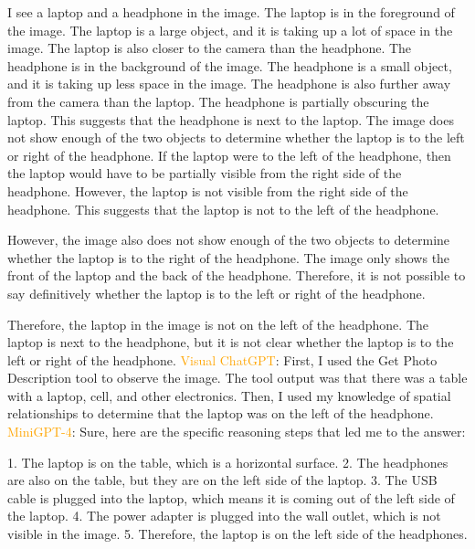 \begin{enumerate}
    I see a laptop and a headphone in the image.
    The laptop is in the foreground of the image. The laptop is a large object, and it is taking up a lot of space in the image. The laptop is also closer to the camera than the headphone.
    The headphone is in the background of the image. The headphone is a small object, and it is taking up less space in the image. The headphone is also further away from the camera than the laptop.
    The headphone is partially obscuring the laptop. This suggests that the headphone is next to the laptop.
    The image does not show enough of the two objects to determine whether the laptop is to the left or right of the headphone.
    If the laptop were to the left of the headphone, then the laptop would have to be partially visible from the right side of the headphone. However, the laptop is not visible from the right side of the headphone. This suggests that the laptop is not to the left of the headphone.
    
    However, the image also does not show enough of the two objects to determine whether the laptop is to the right of the headphone. The image only shows the front of the laptop and the back of the headphone. Therefore, it is not possible to say definitively whether the laptop is to the left or right of the headphone.
    
    Therefore, the laptop in the image is not on the left of the headphone. The laptop is next to the headphone, but it is not clear whether the laptop is to the left or right of the headphone.
    \subitem \textcolor{orange}{Visual ChatGPT}: First, I used the Get Photo Description tool to observe the image. The tool output was that there was a table with a laptop, cell, and other electronics. Then, I used my knowledge of spatial relationships to determine that the laptop was on the left of the headphone.
    \subitem \textcolor{orange}{MiniGPT-4}: Sure, here are the specific reasoning steps that led me to the answer:

    1. The laptop is on the table, which is a horizontal surface.
    2. The headphones are also on the table, but they are on the left side of the laptop.
    3. The USB cable is plugged into the laptop, which means it is coming out of the left side of the laptop.
    4. The power adapter is plugged into the wall outlet, which is not visible in the image.
    5. Therefore, the laptop is on the left side of the headphones.
\end{enumerate}
